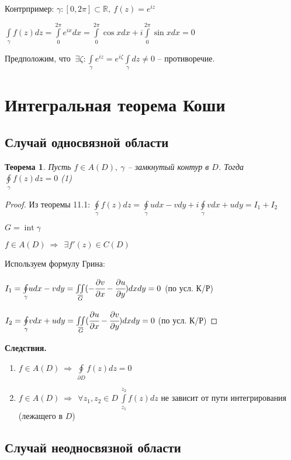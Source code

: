 \documentclass[draft]{article}
\newcommand{\dd}{\partial}
\newcommand{\then}{\ \Rightarrow\ }
\newcommand{\R}{\mathbb{R}}
\newcommand{\mint}[2]{\underset{#1}{\overset{#2}{\int}}}
\newcommand{\moint}[1]{\underset{#1}{\oint}}
\renewcommand{\bar}{\overline}
\newcommand{\Int}{\mathop{\mathrm{int}}\nolimits}
\newcommand{\g}{\gamma}
\newcommand{\E}{\ \exists}
\newcommand{\F}{\ \forall}
\newtheorem*{theor}{Теорема}
\theoremstyle{remark}
\begin{document}
Контрпример: $\g\colon[0,2\pi]\subset\R,\ f(z)=e^{iz}$

$\mint{\g}{}f(z)dz=\mint{0}{2\pi}e^{ix}dx=\mint{0}{2\pi}\cos xdx+i\mint{0}{2\pi}\sin xdx=0$

Предположим, что $\E\zeta\colon\mint{\g}{}e^{iz}=e^{i\zeta}\mint{\g}{}dz\neq0$ -- противоречие.

\newpage

\section{Интегральная теорема Коши}

\subsection{Случай односвязной области}

\begin{theor}
Пусть $f\in A(D),\ \g$ -- замкнутый контур в $D$. Тогда $\moint\g f(z)dz=0$ (1)
\end{theor}
\begin{proof}
Из теоремы 11.1: $\moint\g f(z)dz=\moint\g udx-vdy+i\moint\g vdx+udy=I_1+I_2$

$G=\Int \g$

$f\in A(D)\then \E f'(z)\in C(D)$

Используем формулу Грина:

$I_1=\moint\g udx-vdy=\underset{\bar{G}}{\iint}(-\cfrac{\dd v}{\dd x}-\cfrac{\dd u}{\dd y})dxdy=0$ (по усл. К/Р)

$I_2=\moint\g vdx+udy=\underset{\bar{G}}{\iint}(\cfrac{\dd u}{\dd x}-\cfrac{\dd v}{\dd y})dxdy=0$ (по усл. К/Р)
\end{proof}

{\bfseries Следствия.}
\begin{enumerate}
\item $f\in A(D)\then\moint{\dd D}f(z)dz=0$
\item $f\in A(D)\then\F z_1,z_2\in D\  \mint{z_1}{z_2}f(z)dz$ не зависит от пути интегрирования (лежащего в $D$)
\end{enumerate}

\subsection{Случай неодносвязной области}
\end{document}
